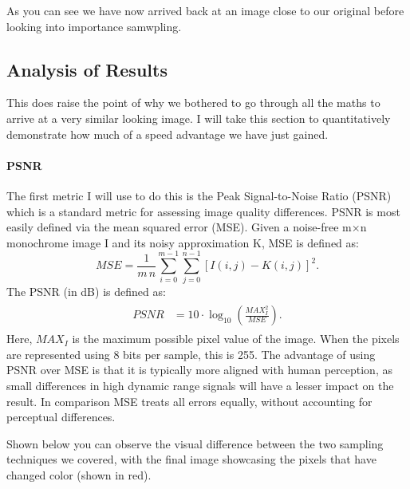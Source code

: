 \documentclass[12pt]{article}
\begin{document}
As you can see we have now arrived back at an image close to our original before looking into importance samwpling.

\subsection{Analysis of Results}

This does raise the point of why we bothered to go through all the maths to arrive at a very similar looking image. I will take this section to quantitatively demonstrate how much of a speed advantage we have just gained.

\paragraph{PSNR} The first metric I will use to do this is the Peak Signal-to-Noise Ratio (PSNR) which is a standard metric for assessing image quality differences. PSNR is most easily defined via the mean squared error (MSE). Given a noise-free m×n monochrome image I and its noisy approximation K, MSE is defined as:
\[
    {\displaystyle {\mathit {MSE}}={\frac {1}{m\,n}}\sum _{i=0}^{m-1}\sum _{j=0}^{n-1}[I(i,j)-K(i,j)]^{2}.}
\]
The PSNR (in dB) is defined as:
\[
    \begin{array}{c} {\displaystyle {\begin{aligned}{\mathit {PSNR}}&=10\cdot \log _{10}\left({\frac {{\mathit {MAX}}_{I}^{2}}{\mathit {MSE}}}\right).\end{aligned}}} \end{array}
\]
Here, $MAX_I$ is the maximum possible pixel value of the image. When the pixels are represented using 8 bits per sample, this is 255. The advantage of using PSNR over MSE is that it is typically more aligned with human perception, as small differences in high dynamic range signals will have a lesser impact on the result. In comparison MSE treats all errors equally, without accounting for perceptual differences.


Shown below you can observe the visual difference between the two sampling techniques we covered, with the final image showcasing the pixels that have changed color (shown in red).
\end{document}

